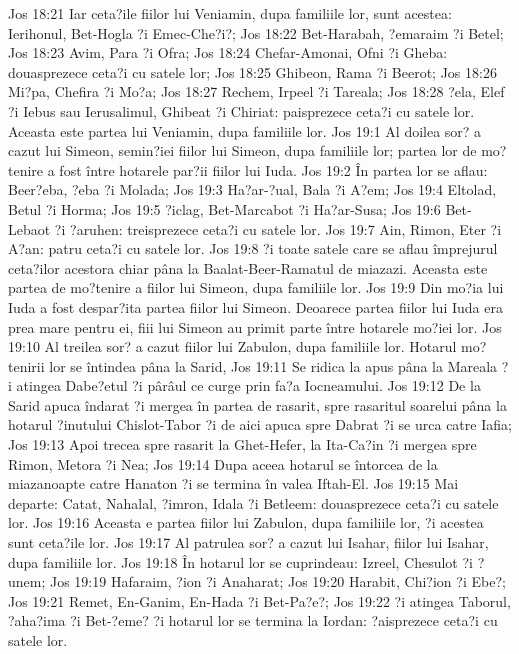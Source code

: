 Jos 18:21  Iar ceta?ile fiilor lui Veniamin, dupa familiile lor, sunt acestea: Ierihonul, Bet-Hogla ?i Emec-Che?i?;
Jos 18:22  Bet-Harabah, ?emaraim ?i Betel;
Jos 18:23  Avim, Para ?i Ofra;
Jos 18:24  Chefar-Amonai, Ofni ?i Gheba: douasprezece ceta?i cu satele lor;
Jos 18:25  Ghibeon, Rama ?i Beerot;
Jos 18:26  Mi?pa, Chefira ?i Mo?a;
Jos 18:27  Rechem, Irpeel ?i Tareala;
Jos 18:28  ?ela, Elef ?i Iebus sau Ierusalimul, Ghibeat ?i Chiriat: paisprezece ceta?i cu satele lor. Aceasta este partea lui Veniamin, dupa familiile lor.
Jos 19:1  Al doilea sor? a cazut lui Simeon, semin?iei fiilor lui Simeon, dupa familiile lor; partea lor de mo?tenire a fost între hotarele par?ii fiilor lui Iuda.
Jos 19:2  În partea lor se aflau: Beer?eba, ?eba ?i Molada;
Jos 19:3  Ha?ar-?ual, Bala ?i A?em;
Jos 19:4  Eltolad, Betul ?i Horma;
Jos 19:5  ?iclag, Bet-Marcabot ?i Ha?ar-Susa;
Jos 19:6  Bet-Lebaot ?i ?aruhen: treisprezece ceta?i cu satele lor.
Jos 19:7  Ain, Rimon, Eter ?i A?an: patru ceta?i cu satele lor.
Jos 19:8  ?i toate satele care se aflau împrejurul ceta?ilor acestora chiar pâna la Baalat-Beer-Ramatul de miazazi. Aceasta este partea de mo?tenire a fiilor lui Simeon, dupa familiile lor.
Jos 19:9  Din mo?ia lui Iuda a fost despar?ita partea fiilor lui Simeon. Deoarece partea fiilor lui Iuda era prea mare pentru ei, fiii lui Simeon au primit parte între hotarele mo?iei lor.
Jos 19:10  Al treilea sor? a cazut fiilor lui Zabulon, dupa familiile lor. Hotarul mo?tenirii lor se întindea pâna la Sarid,
Jos 19:11  Se ridica la apus pâna la Mareala ?i atingea Dabe?etul ?i pârâul ce curge prin fa?a Iocneamului.
Jos 19:12  De la Sarid apuca îndarat ?i mergea în partea de rasarit, spre rasaritul soarelui pâna la hotarul ?inutului Chislot-Tabor ?i de aici apuca spre Dabrat ?i se urca catre Iafia;
Jos 19:13  Apoi trecea spre rasarit la Ghet-Hefer, la Ita-Ca?in ?i mergea spre Rimon, Metora ?i Nea;
Jos 19:14  Dupa aceea hotarul se întorcea de la miazanoapte catre Hanaton ?i se termina în valea Iftah-El.
Jos 19:15  Mai departe: Catat, Nahalal, ?imron, Idala ?i Betleem: douasprezece ceta?i cu satele lor.
Jos 19:16  Aceasta e partea fiilor lui Zabulon, dupa familiile lor, ?i acestea sunt ceta?ile lor.
Jos 19:17  Al patrulea sor? a cazut lui Isahar, fiilor lui Isahar, dupa familiile lor.
Jos 19:18  În hotarul lor se cuprindeau: Izreel, Chesulot ?i ?unem;
Jos 19:19  Hafaraim, ?ion ?i Anaharat;
Jos 19:20  Harabit, Chi?ion ?i Ebe?;
Jos 19:21  Remet, En-Ganim, En-Hada ?i Bet-Pa?e?;
Jos 19:22  ?i atingea Taborul, ?aha?ima ?i Bet-?eme? ?i hotarul lor se termina la Iordan: ?aisprezece ceta?i cu satele lor.
